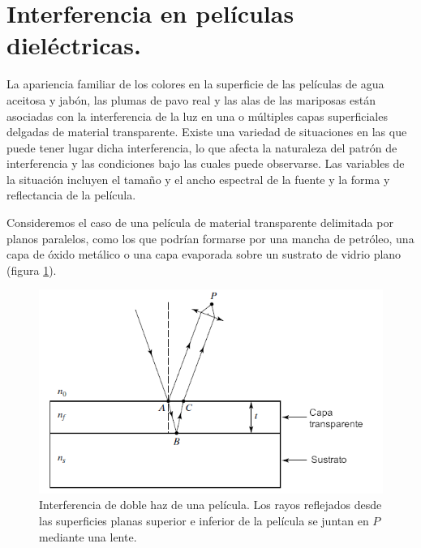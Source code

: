 \documentclass[14pt]{extarticle}
\begin{document}
\section{Interferencia en películas dieléctricas.}

La apariencia familiar de los colores en la superficie de las películas de agua aceitosa y jabón, las plumas de pavo real y las alas de las mariposas están asociadas con la interferencia de la luz en una o múltiples capas superficiales delgadas de material transparente. Existe una variedad de situaciones en las que puede tener lugar dicha interferencia, lo que afecta la naturaleza del patrón de interferencia y las condiciones bajo las cuales puede observarse. Las variables de la situación incluyen el tamaño y el ancho espectral de la fuente y la forma y reflectancia de la película. 
\par
Consideremos el caso de una película de material transparente delimitada por planos paralelos, como los que podrían formarse por una mancha de petróleo, una capa de óxido metálico o una capa evaporada sobre un sustrato de vidrio plano (figura \ref{fig:figura_07_10}).
\begin{figure}[H]
    \centering
    \includegraphics[scale=0.8]{Imagenes/Interferencia2_07.png}
    \caption{Interferencia de doble haz de una película. Los rayos reflejados desde las superficies planas superior e inferior de la película se juntan en $P$ mediante una lente.}
    \label{fig:figura_07_10}
\end{figure}
\end{document}
